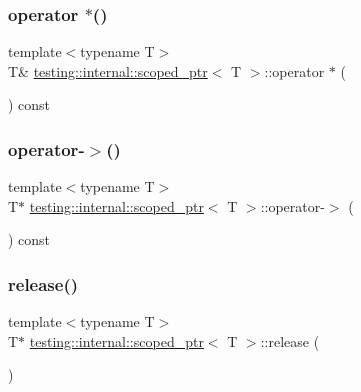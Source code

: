 \subsubsection{\texorpdfstring{operator $\ast$()}{operator *()}}
{\footnotesize\ttfamily template$<$typename T$>$ \\
T\& \mbox{\hyperlink{classtesting_1_1internal_1_1scoped__ptr}{testing\+::internal\+::scoped\+\_\+ptr}}$<$ T $>$\+::operator $\ast$ (\begin{DoxyParamCaption}{ }\end{DoxyParamCaption}) const\hspace{0.3cm}{\ttfamily [inline]}}

\mbox{\label{classtesting_1_1internal_1_1scoped__ptr_a2b465830a322e2c3ea420e5ccf0472f4}} 
\subsubsection{\texorpdfstring{operator-\/$>$()}{operator->()}}
{\footnotesize\ttfamily template$<$typename T$>$ \\
T$\ast$ \mbox{\hyperlink{classtesting_1_1internal_1_1scoped__ptr}{testing\+::internal\+::scoped\+\_\+ptr}}$<$ T $>$\+::operator-\/$>$ (\begin{DoxyParamCaption}{ }\end{DoxyParamCaption}) const\hspace{0.3cm}{\ttfamily [inline]}}

\mbox{\label{classtesting_1_1internal_1_1scoped__ptr_a7a4f3e568d81a5d8bcb5f8d6bf5130b1}} 
\subsubsection{\texorpdfstring{release()}{release()}}
{\footnotesize\ttfamily template$<$typename T$>$ \\
T$\ast$ \mbox{\hyperlink{classtesting_1_1internal_1_1scoped__ptr}{testing\+::internal\+::scoped\+\_\+ptr}}$<$ T $>$\+::release (\begin{DoxyParamCaption}{ }\end{DoxyParamCaption})\hspace{0.3cm}{\ttfamily [inline]}}

